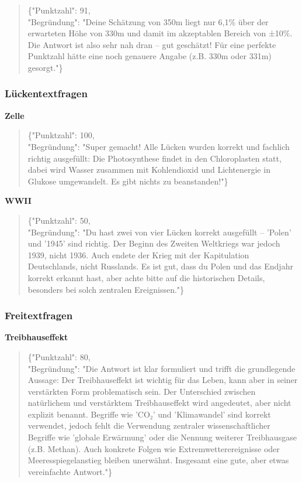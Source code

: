\documentclass[a4paper,12pt]{article}
\begin{document}
\begin{quote}
\{"Punktzahl": 91,\\
"Begründung": "Deine Schätzung von 350m liegt nur 6,1\% über der erwarteten Höhe von 330m und damit im akzeptablen Bereich von ±10\%. Die Antwort ist also sehr nah dran – gut geschätzt! Für eine perfekte Punktzahl hätte eine noch genauere Angabe (z.B. 330m oder 331m) gesorgt."\}
\end{quote}

\subsubsection{Lückentextfragen}

\textbf{Zelle}
\begin{quote}
\{"Punktzahl": 100,\\
"Begründung": "Super gemacht! Alle Lücken wurden korrekt und fachlich richtig ausgefüllt: Die Photosynthese findet in den Chloroplasten statt, dabei wird Wasser zusammen mit Kohlendioxid und Lichtenergie in Glukose umgewandelt. Es gibt nichts zu beanstanden!"\}
\end{quote}

\textbf{WWII}
\begin{quote}
\{"Punktzahl": 50,\\
"Begründung": "Du hast zwei von vier Lücken korrekt ausgefüllt – 'Polen' und '1945' sind richtig. Der Beginn des Zweiten Weltkriegs war jedoch 1939, nicht 1936. Auch endete der Krieg mit der Kapitulation Deutschlands, nicht Russlands. Es ist gut, dass du Polen und das Endjahr korrekt erkannt hast, aber achte bitte auf die historischen Details, besonders bei solch zentralen Ereignissen."\}
\end{quote}

\subsubsection{Freitextfragen}

\textbf{Treibhauseffekt}
\begin{quote}
\{"Punktzahl": 80,\\
"Begründung": "Die Antwort ist klar formuliert und trifft die grundlegende Aussage: Der Treibhauseffekt ist wichtig für das Leben, kann aber in seiner verstärkten Form problematisch sein. Der Unterschied zwischen natürlichem und verstärktem Treibhauseffekt wird angedeutet, aber nicht explizit benannt. Begriffe wie 'CO₂' und 'Klimawandel' sind korrekt verwendet, jedoch fehlt die Verwendung zentraler wissenschaftlicher Begriffe wie 'globale Erwärmung' oder die Nennung weiterer Treibhausgase (z.B. Methan). Auch konkrete Folgen wie Extremwetterereignisse oder Meeresspiegelanstieg bleiben unerwähnt. Insgesamt eine gute, aber etwas vereinfachte Antwort."\}
\end{quote}
\end{document}
